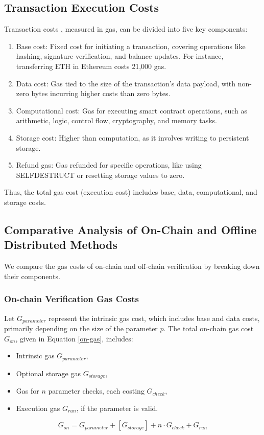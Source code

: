 \documentclass[runningheads]{llncs}
\begin{document}
\subsection{Transaction Execution Costs}
Transaction costs \cite{eth-yellowpaper,chen2019underoptimized,victor2019measuring}, measured in gas, can be divided into five key components:
\begin{enumerate}
\item Base cost: Fixed cost for initiating a transaction, covering operations like hashing, signature verification, and balance updates. For instance, transferring ETH in Ethereum costs 21,000 gas.
\item Data cost: Gas tied to the size of the transaction’s data payload, with non-zero bytes incurring higher costs than zero bytes.
\item Computational cost: Gas for executing smart contract operations, such as arithmetic, logic, control flow, cryptography, and memory tasks.
\item Storage cost: Higher than computation, as it involves writing to persistent storage. %
\item Refund gas: Gas refunded for specific operations, like using SELFDESTRUCT or resetting storage values to zero.
\end{enumerate}
Thus, the total gas cost (execution cost) includes base, data, computational, and storage costs.
\subsection{Comparative Analysis of On-Chain and Offline Distributed Methods}
We compare the gas costs of on-chain and off-chain verification by breaking down their components.
\subsubsection{On-chain Verification Gas Costs}
Let \( G_{parameter} \) represent the intrinsic gas cost, which includes base and data costs, primarily depending on the size of the parameter \( p \). The total on-chain gas cost \( G_{on} \), given in Equation \ref{on-gas}, includes:
\begin{itemize}
    \item Intrinsic gas \( G_{parameter} \),
    \item Optional storage gas \( G_{storage} \),
    \item Gas for \( n \) parameter checks, each costing \( G_{check} \),
    \item Execution gas \( G_{run} \), if the parameter is valid.
\end{itemize}
\begin{equation}
\label{on-gas}
G_{on} = G_{parameter} + [G_{storage}] + n \cdot G_{check} + G_{run}
\end{equation}
\end{document}
